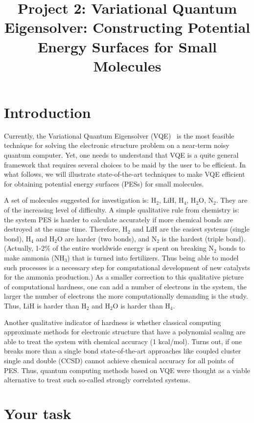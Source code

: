 \documentclass[12pt]{article}
\title{Project 2: Variational Quantum Eigensolver: Constructing Potential Energy Surfaces for Small Molecules }
\date{}
\begin{document}
\maketitle

\section*{Introduction}

Currently, the Variational Quantum Eigensolver (VQE)~\cite{Peruzzo2014} 
is the most feasible technique for solving the electronic structure problem on a near-term 
noisy quantum computer. Yet, one needs to understand that VQE is a quite general framework that requires several choices to be maid by the user 
to be efficient. In what follows, we will illustrate state-of-the-art techniques to make VQE efficient for obtaining potential energy surfaces (PESs) 
for small molecules. 

A set of molecules suggested for investigation is: H$_2$, LiH, H$_4$, H$_2$O, N$_2$. They are of the increasing level of difficulty. A simple 
qualitative rule from chemistry is: the system PES is harder to calculate accurately if more chemical bonds are destroyed at the same time. 
Therefore, H$_2$ and LiH are the easiest systems (single bond), H$_4$ and H$_2$O are harder (two bonds), and N$_2$ is the hardest (triple bond).
(Actually, 1-2\% of the entire worldwide energy is spent on breaking N$_2$ bonds to make ammonia (NH$_3$) that is turned into fertilizers. 
Thus being able to model such processes is a necessary step for computational development of new catalysts for the ammonia production.)     
As a smaller correction to this qualitative picture of computational hardness, one can add a number of electrons in the system, the larger the number 
of electrons the more computationally demanding is the study. Thus, LiH is harder than H$_2$ and H$_2$O is harder than H$_4$. 

Another qualitative indicator of hardness is whether classical computing approximate methods for electronic structure that have a polynomial 
scaling are able to treat the system with chemical accuracy (1 kcal/mol). Turns out, if one breaks more than a single bond state-of-the-art approaches 
like coupled cluster single and double (CCSD) cannot achieve chemical accuracy for all points of PES. Thus, quantum computing methods based 
on VQE were thought as a viable alternative to treat such so-called strongly correlated systems.   

\section*{Your task} \label{sec:tasks}
\end{document}
